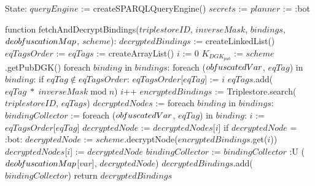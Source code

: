 State:
    $queryEngine$ := createSPARQLQueryEngine()
    $secrets$ := {}
    $planner$ := :bot

function fetchAndDecryptBindings($triplestoreID$, $inverseMask$, $bindings$, $deob\textrm{\emph{f}}uscationMap$, $scheme$):
    $decryptedBindings$ := createLinkedList()
    $eqTagsOrder$ := {}
    $eqTags$ := createArrayList()
    $i$ := 0
    $K_{DGK_{pub}}$ := $scheme$.getPubDGK()
    foreach $binding$ in $bindings$:
        foreach ($ob\textrm{\emph{f}}uscatedVar$, $eqTag$) in $binding$:
            if $eqTag \notin eqTagsOrder$: 
                $eqTagsOrder$[$eqTag$] := $i$
                $eqTags$.add($eqTag \; * \; inverseMask \; \textrm{mod} \; n$)
                $i$++
    $encryptedBindings$ := Triplestore.search($triplestoreID$, $eqTags$)
    $decryptedNodes$ := {}
    foreach $binding$ in $bindings$:
        $bindingCollector$ := {}
        foreach ($ob\textrm{\emph{f}}uscatedVar$, $eqTag$) in $binding$:
            $i$ := $eqTagsOrder$[$eqTag$]
            $decryptedNode$ := $decryptedNodes$[$i$]
            if $decryptedNode$ = :bot:
                $decryptedNode$ := $scheme$.decryptNode($encryptedBindings$.get($i$))
                $decryptedNodes$[$i$] := $decryptedNode$
            $bindingCollector$ := $bindingCollector$ :U { ($deob\textrm{\emph{f}}uscationMap$[$var$], $decryptedNode$) }
        $decryptedBindings$.add($bindingCollector$)
    return $decryptedBindings$
